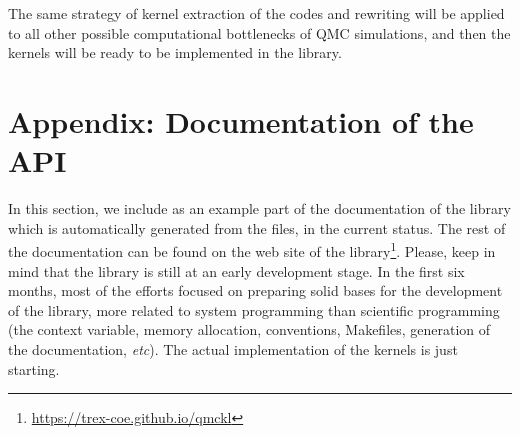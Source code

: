 The same strategy of kernel extraction of the codes and rewriting
will be applied to all other possible computational bottlenecks of QMC
simulations, and then the kernels will be ready to be implemented in
the library.




\appendix
\section{Appendix: Documentation of the API}

In this section, we include as an example part of the documentation of
the library which is automatically generated from the {\orgmode}
files, in the current status. The rest of the documentation can be
found on the web site of the library\footnote{\url{https://trex-coe.github.io/qmckl}}.
Please, keep in mind that the library is still at an early development
stage. In the first six months, most of the efforts focused on
preparing solid bases for the development of
the library, more related to system programming than scientific
programming (the context variable, memory allocation, conventions,
Makefiles, generation of the documentation, \textit{etc}). The actual
implementation of the kernels is just starting.


\clearpage




